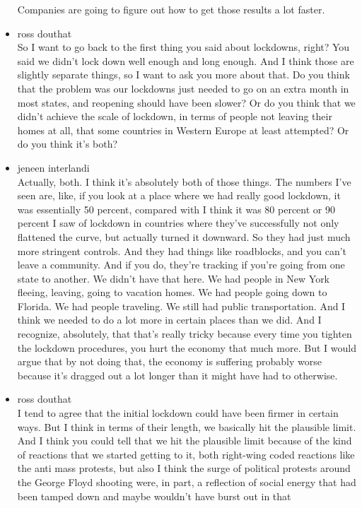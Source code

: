 \begin{itemize}
  Companies are going to figure out how to get those results a lot
  faster.
\item
  ross douthat\\
  So I want to go back to the first thing you said about lockdowns,
  right? You said we didn't lock down well enough and long enough. And I
  think those are slightly separate things, so I want to ask you more
  about that. Do you think that the problem was our lockdowns just
  needed to go on an extra month in most states, and reopening should
  have been slower? Or do you think that we didn't achieve the scale of
  lockdown, in terms of people not leaving their homes at all, that some
  countries in Western Europe at least attempted? Or do you think it's
  both?
\item
  jeneen interlandi\\
  Actually, both. I think it's absolutely both of those things. The
  numbers I've seen are, like, if you look at a place where we had
  really good lockdown, it was essentially 50 percent, compared with I
  think it was 80 percent or 90 percent I saw of lockdown in countries
  where they've successfully not only flattened the curve, but actually
  turned it downward. So they had just much more stringent controls. And
  they had things like roadblocks, and you can't leave a community. And
  if you do, they're tracking if you're going from one state to another.
  We didn't have that here. We had people in New York fleeing, leaving,
  going to vacation homes. We had people going down to Florida. We had
  people traveling. We still had public transportation. And I think we
  needed to do a lot more in certain places than we did. And I
  recognize, absolutely, that that's really tricky because every time
  you tighten the lockdown procedures, you hurt the economy that much
  more. But I would argue that by not doing that, the economy is
  suffering probably worse because it's dragged out a lot longer than it
  might have had to otherwise.
\item
  ross douthat\\
  I tend to agree that the initial lockdown could have been firmer in
  certain ways. But I think in terms of their length, we basically hit
  the plausible limit. And I think you could tell that we hit the
  plausible limit because of the kind of reactions that we started
  getting to it, both right-wing coded reactions like the anti mass
  protests, but also I think the surge of political protests around the
  George Floyd shooting were, in part, a reflection of social energy
  that had been tamped down and maybe wouldn't have burst out in that

\end{itemize}
